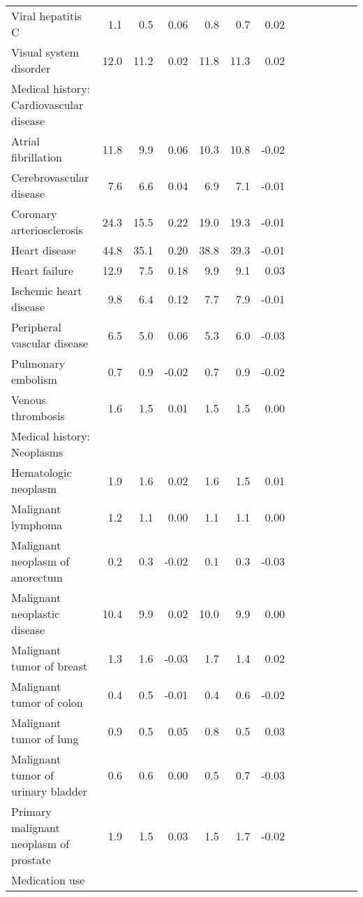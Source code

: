 \documentclass[11pt,]{article}
\begin{document}
\begin{longtable}{lrrrrrrrrrrrr}
      Viral hepatitis C &  1.1 &  0.5 &  0.06 &  0.8 &  0.7 &  0.02 \\ 
      Visual system disorder & 12.0 & 11.2 &  0.02 & 11.8 & 11.3 &  0.02 \\ 
  Medical history: Cardiovascular disease &    &    &     &    &    &     \\ 
      Atrial fibrillation & 11.8 &  9.9 &  0.06 & 10.3 & 10.8 & -0.02 \\ 
      Cerebrovascular disease &  7.6 &  6.6 &  0.04 &  6.9 &  7.1 & -0.01 \\ 
      Coronary arteriosclerosis & 24.3 & 15.5 &  0.22 & 19.0 & 19.3 & -0.01 \\ 
      Heart disease & 44.8 & 35.1 &  0.20 & 38.8 & 39.3 & -0.01 \\ 
      Heart failure & 12.9 &  7.5 &  0.18 &  9.9 &  9.1 &  0.03 \\ 
      Ischemic heart disease &  9.8 &  6.4 &  0.12 &  7.7 &  7.9 & -0.01 \\ 
      Peripheral vascular disease &  6.5 &  5.0 &  0.06 &  5.3 &  6.0 & -0.03 \\ 
      Pulmonary embolism &  0.7 &  0.9 & -0.02 &  0.7 &  0.9 & -0.02 \\ 
      Venous thrombosis &  1.6 &  1.5 &  0.01 &  1.5 &  1.5 &  0.00 \\ 
  Medical history: Neoplasms &    &    &     &    &    &     \\ 
      Hematologic neoplasm &  1.9 &  1.6 &  0.02 &  1.6 &  1.5 &  0.01 \\ 
      Malignant lymphoma &  1.2 &  1.1 &  0.00 &  1.1 &  1.1 &  0.00 \\ 
      Malignant neoplasm of anorectum &  0.2 &  0.3 & -0.02 &  0.1 &  0.3 & -0.03 \\ 
      Malignant neoplastic disease & 10.4 &  9.9 &  0.02 & 10.0 &  9.9 &  0.00 \\ 
      Malignant tumor of breast &  1.3 &  1.6 & -0.03 &  1.7 &  1.4 &  0.02 \\ 
      Malignant tumor of colon &  0.4 &  0.5 & -0.01 &  0.4 &  0.6 & -0.02 \\ 
      Malignant tumor of lung &  0.9 &  0.5 &  0.05 &  0.8 &  0.5 &  0.03 \\ 
      Malignant tumor of urinary bladder &  0.6 &  0.6 &  0.00 &  0.5 &  0.7 & -0.03 \\ 
      Primary malignant neoplasm of prostate &  1.9 &  1.5 &  0.03 &  1.5 &  1.7 & -0.02 \\ 
  Medication use &    &    &     &    &    &     \\ 

\end{longtable}
\end{document}

